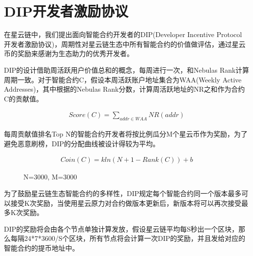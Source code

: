 \section{DIP开发者激励协议}
\label{sec:dip}

在星云链中，我们提出面向智能合约开发者的DIP(Developer Incentive Protocol 开发者激励协议)，周期性对星云链生态中所有智能合约的价值做评估，通过星云币的奖励来感谢为生态助力的优秀开发者。

DIP的设计借助周活跃用户价值总和的概念，每周进行一次，和Nebulas Rank计算周期一致。对于智能合约C，假设本周活跃账户地址集合为WAA(Weekly Active Addresses)，其中根据的Nebulas Rank分数，计算周活跃地址的NR之和作为合约C的贡献值。

\begin{align}
Score(C)=\sum_{addr \in WAA}NR(addr)
\end{align}

每周贡献值排名Top N的智能合约开发者将按比例瓜分M个星云币作为奖励，为了避免恶意刷榜，DIP的分配曲线被设计得较为平均。

\begin{align}
Coin(C) =kln(N+1-Rank(C))+b
\end{align}

\begin{figure}[htbp] 
\centering
{}
\label{fig:dip}
\caption{N=3000, M=3000}
\end{figure}

为了鼓励星云链生态智能合约的多样性，DIP规定每个智能合约同一个版本最多可以接受K次奖励，当使用星云原力对合约做版本更新后，新版本将可以再次接受最多K次奖励。

DIP的奖励将会由各个节点单独计算发放，假设星云链平均每S秒出一个区块，那么每隔24*7*3600/S个区块，所有节点将会计算一次DIP的奖励，并且发给对应的智能合约的提币地址中。
